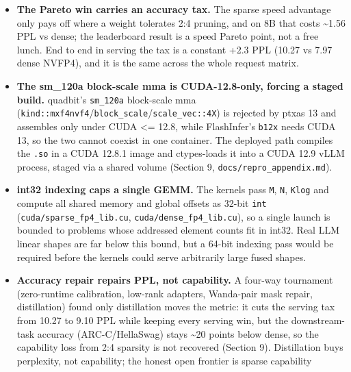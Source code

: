 \documentclass[
]{article}
\begin{document}
\begin{itemize}
  (Section 4) shows FlashInfer \texttt{b12x}/\texttt{cutlass} beating
  our two-level dense by 1.35 to 2.2x. The dense kernel remains a useful
  zero-training W4A4 drop-in on the accuracy axis, but it is not the
  fastest dense FP4 on the platform. The win is sparse (the only
  deployed sparse FP4 GEMM, faster in wall-clock than even the best
  FlashInfer dense on prefill shapes), not dense.
\item
  \textbf{The Pareto win carries an accuracy tax.} The sparse speed
  advantage only pays off where a weight tolerates 2:4 pruning, and on
  8B that costs \textasciitilde1.56 PPL vs dense; the leaderboard result
  is a speed Pareto point, not a free lunch. End to end in serving the
  tax is a constant +2.3 PPL (10.27 vs 7.97 dense NVFP4), and it is the
  same across the whole request matrix.
\item
  \textbf{The sm\_120a block-scale mma is CUDA-12.8-only, forcing a
  staged build.} quadbit's \texttt{sm\_120a} block-scale mma
  (\texttt{kind::mxf4nvf4}/\texttt{block\_scale}/\texttt{scale\_vec::4X})
  is rejected by ptxas 13 and assembles only under CUDA \textless= 12.8,
  while FlashInfer's \texttt{b12x} needs CUDA 13, so the two cannot
  coexist in one container. The deployed path compiles the \texttt{.so}
  in a CUDA 12.8.1 image and ctypes-loads it into a CUDA 12.9 vLLM
  process, staged via a shared volume (Section 9,
  \texttt{docs/repro\_appendix.md}).
\item
  \textbf{int32 indexing caps a single GEMM.} The kernels pass
  \texttt{M}, \texttt{N}, \texttt{Klog} and compute all shared memory
  and global offsets as 32-bit \texttt{int}
  (\texttt{cuda/sparse\_fp4\_lib.cu}, \texttt{cuda/dense\_fp4\_lib.cu}),
  so a single launch is bounded to problems whose addressed element
  counts fit in int32. Real LLM linear shapes are far below this bound,
  but a 64-bit indexing pass would be required before the kernels could
  serve arbitrarily large fused shapes.
\item
  \textbf{Accuracy repair repairs PPL, not capability.} A four-way
  tournament (zero-runtime calibration, low-rank adapters, Wanda-pair
  mask repair, distillation) found only distillation moves the metric:
  it cuts the serving tax from 10.27 to 9.10 PPL while keeping every
  serving win, but the downstream-task accuracy (ARC-C/HellaSwag) stays
  \textasciitilde20 points below dense, so the capability loss from 2:4
  sparsity is not recovered (Section 9). Distillation buys perplexity,
  not capability; the honest open frontier is sparse capability

\end{itemize}
\end{document}
